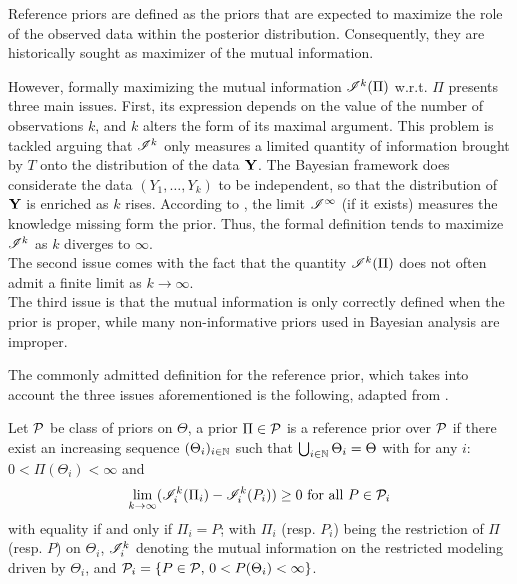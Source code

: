 Reference priors are defined as the priors that are expected to maximize the role of the observed data within the posterior distribution.
Consequently, they are historically sought as maximizer of the mutual information.

However, formally maximizing the mutual information $\mathscr{I}^k(\Pi)$ w.r.t. $\Pi$ presents three main issues. %
First, its expression depends on the value of the number of  observations $k$, and $k$ alters the form of its maximal argument. %
This problem is tackled arguing that $\mathscr{I}^k$ only measures a limited quantity of information brought by $T$ onto the distribution of the data $\mathbf{Y}$. The Bayesian framework does considerate the data $(Y_1,\dots,Y_k)$ to be independent, so that the distribution of $\mathbf{Y}$ is enriched as $k$ rises.
According to \citet{bernardo_bayesian_1994}, the limit $\mathscr{I}^\infty$ (if it exists) measures the knowledge missing form the prior.
Thus, the formal definition tends to maximize $\mathscr{I}^k$ as $k$ diverges to $\infty$.\\
The second issue comes with the fact that the quantity $\mathscr{I}^k(\Pi)$ does not often admit a finite limit as $k\to\infty$.\\
The third issue is that the mutual information is only correctly defined when the prior is proper, while many non-informative priors used in Bayesian analysis are improper.

The commonly admitted definition for the reference prior, which takes into account the three issues aforementioned is the following, adapted from \cite{dey_reference_2005}.
\begin{defi}\label{def:intro-ref:ref-priors}
    Let $\mathcal{P}$ be class of priors on $\Theta$, a prior $\Pi\in\mathcal{P}$ %
    is a reference prior over $\mathcal{P}$ if there exist an increasing sequence $(\Theta_i)_{i\in\mathbb{N}}$ such that $\bigcup_{i\in\mathbb{N}}\Theta_i=\Theta$ with for any $i$: $0<\Pi(\Theta_i)<\infty  $ and
        \begin{equation}
            \lim_{k\rightarrow\infty} (\mathscr{I}^k_i(\Pi_i) - \mathscr{I}^k_i(P_i) )\geq 0 \text{\ for all\ } P\in\mathcal{P}_i
        \end{equation}
    with equality if and only if $\Pi_i=P$; with $\Pi_i$ (resp. $P_i$) being the restriction of $\Pi$ (resp. $P$) on $\Theta_i$, $\mathscr{I}_i^k$ denoting the mutual information on the restricted modeling driven by $\Theta_i$, and $\mathcal{P}_i=\{P\in\mathcal{P},\,0<P(\Theta_i)<\infty\}$.
\end{defi}


